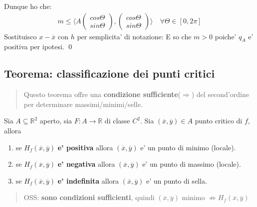 \documentclass{article}
\begin{document}
\begin{enumerate}
    Dunque ho che:
    \begin{align*}
      m \leq \langle A \begin{pmatrix}cos \Theta \\ sin \Theta \end{pmatrix}, \begin{pmatrix}cos \Theta \\ sin \Theta \end{pmatrix} \rangle
      \quad \forall \Theta \in [0,2\pi]
    \end{align*}
    Sostituisco $x - \overline{x}$ con $h$ per semplicita' di notazione:
    E so che $m > 0$ poiche' $q_A$ e' positiva per ipotesi. \qed
\end{enumerate}

\subsection{Teorema: classificazione dei punti critici}

\begin{quote}
  Questo teorema offre una \textbf{condizione sufficiente}($\Rightarrow$) del second'ordine
  per determinare massimi/minimi/selle.
\end{quote}

Sia $A \subseteq \mathbb{R}^2$ aperto, sia $F: A \to \mathbb{R}$ di classe $C^2$.
Sia $(\overline{x}, \overline{y}) \in A$ punto critico di $f$, allora
\begin{enumerate}
  \item se $H_f(\overline{x}, \overline{y})$ \textbf{e' positiva} allora $(\overline{x}, \overline{y})$ e' un punto di minimo (locale).
  \item se $H_f(\overline{x}, \overline{y})$ \textbf{e' negativa} allora $(\overline{x}, \overline{y})$ e' un punto di massimo (locale).
  \item se $H_f(\overline{x}, \overline{y})$ \textbf{e' indefinita} allora $(\overline{x}, \overline{y})$ e' un punto di sella.
\end{enumerate}

\begin{quote}
  OSS: \textbf{sono condizioni sufficienti}, quindi $(\overline{x}, \overline{y})
  \text{ minimo } \not\Rightarrow H_f(\overline{x}, \overline{y})$ 
\end{quote}
\end{document}
